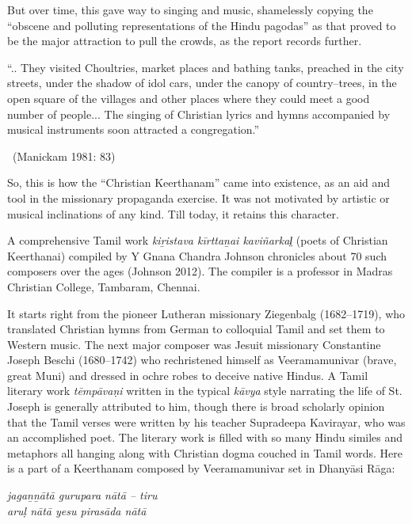 But over time, this gave way to singing and music, shamelessly copying the “obscene and polluting representations of the Hindu pagodas” as that proved to be the major attraction to pull the crowds, as the report records further.

\begin{myquote}
“.. They visited Choultries, market places and bathing tanks, preached in the city streets, under the shadow of idol cars, under the canopy of country–trees, in the open square of the villages and other places where they could meet a good number of people... The singing of Christian lyrics and hymns accompanied by musical instruments soon attracted a congregation.” 

~\hfill (Manickam 1981: 83)
\end{myquote}

So, this is how the “Christian Keerthanam” came into existence, as an aid and tool in the missionary propaganda exercise. It was not motivated by artistic or musical inclinations of any kind. Till today, it retains this character.

A comprehensive Tamil work \textit{kiṟistava kīrttaṉai kaviñarkal̤} (poets of Christian Keerthanai) compiled by Y Gnana Chandra Johnson chronicles about 70 such composers over the ages (Johnson 2012). The compiler is a professor in Madras Christian College, Tambaram, Chennai.

It starts right from the pioneer Lutheran missionary Ziegenbalg (1682–1719), who translated Christian hymns from German to colloquial Tamil and set them to Western music. The next major composer was Jesuit missionary Constantine Joseph Beschi (1680–1742) who rechristened himself as Veeramamunivar (brave, great Muni) and dressed in ochre robes to deceive native Hindus. A Tamil literary work \textit{tēmpāvaṇi }written in the typical \textit{kāvya} style narrating the life of St. Joseph is generally attributed to him, though there is broad scholarly opinion that the Tamil verses were written by his teacher Supradeepa Kavirayar, who was an accomplished poet. The literary work is filled with so many Hindu similes and metaphors all hanging along with Christian dogma couched in Tamil words. Here is a part of a Keerthanam composed by Veeramamunivar set in Dhanyāsi Rāga:

\begin{myquote}
\textit{jagaṉṉātā gurupara nātā – tiru \\ aruḷ nātā yesu pirasāda nātā }
\end{myquote}

